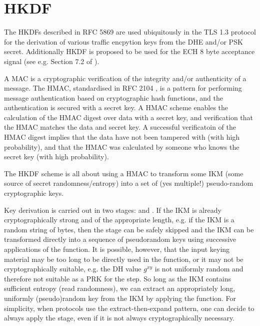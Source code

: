 
\section{HKDF}

The \acp{HKDF} described in RFC 5869 \citep{rfc5869hkdf} are used ubiquitously in the \ac{TLS} 1.3 protocol for the derivation of various traffic encpytion keys from the \ac{DHE} and/or \ac{PSK} secret.
Additionally \ac{HKDF} is proposed to be used for the \ac{ECH}  8 byte acceptance signal (see e.g. Section 7.2 of \cite{esni}).

A \ac{MAC} is a cryptographic verification of the integrity and/or authenticity of a message. The \ac{HMAC}, standardised in RFC 2104  \citep{rfc2104}, is a pattern for performing message authentication based on cryptographic hash functions, and the authentication is secured with a secret key.
A \ac{HMAC} scheme enables the calculation of the \ac{HMAC} digest over data with a secret key, and verification that the \ac{HMAC} matches the data and secret key.
A successful verificatoin of the \ac{HMAC} digest
implies that the data have not been tampered with (with high probability),
and that the \ac{HMAC} was calculated by someone who knows the secret key (with high probability).

The \ac{HKDF} scheme is all about using a \ac{HMAC} to transform some \ac{IKM} (some source of secret randomness/entropy)
into a set of (yes multiple!) pseudo-random cryptographic keys.

Key derivation is carried out in two stages:  and .
If the \ac{IKM} is already cryptographically strong and of the appropriate length, e.g. if the \ac{IKM} is a random string of  bytes,
then the  stage can be safely skipped and the \ac{IKM}
can be transformed
directly into a sequence of pseudorandom keys using successive applications of the  function.
It is possible, however, that the input keying material may be too long to be directly used in the  function, or it may not be cryptographically suitable, e.g. the \ac{DH} value $g^{xy}$ is not uniformly random and therefore not suitable as a \ac{PRK} for the  step.
So long as the \ac{IKM} contains sufficient entropy (read randomness), we can extract an appropriately long, uniformly (pseudo)random key from the \ac{IKM} by applying the  function.
For simplicity, when protocols use the extract-then-expand pattern, one can decide to always apply the  stage, even if it is not always cryptographically necessary.

